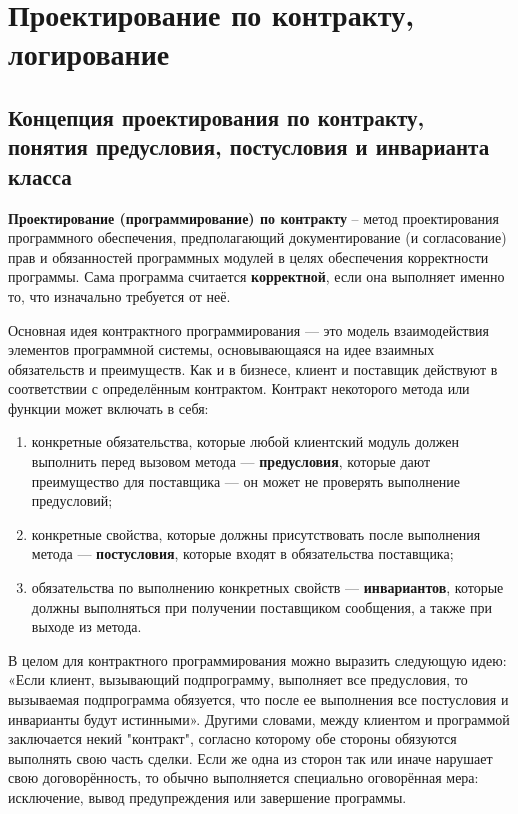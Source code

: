 \newpage
\chapter{Проектирование по контракту, логирование}

\section{Концепция проектирования по контракту, понятия предусловия, постусловия и инварианта класса}

\textbf{Проектирование (программирование) по контракту} –  метод проектирования программного обеспечения, предполагающий документирование (и согласование) прав и обязанностей программных модулей в целях обеспечения корректности программы. Сама программа считается \textbf{корректной}, если она выполняет именно то, что изначально требуется от неё.

Основная идея контрактного программирования — это модель взаимодействия элементов программной системы, основывающаяся на идее взаимных обязательств и преимуществ. Как и в бизнесе, клиент и поставщик действуют в соответствии с определённым контрактом. Контракт некоторого метода или функции может включать в себя:

\begin{enumerate}
    \item конкретные обязательства, которые любой клиентский модуль должен выполнить перед вызовом метода — \textbf{предусловия}, которые дают преимущество для поставщика — он может не проверять выполнение предусловий;
    \item конкретные свойства, которые должны присутствовать после выполнения метода — \textbf{постусловия}, которые входят в обязательства поставщика;
    \item обязательства по выполнению конкретных свойств — \textbf{инвариантов}, которые должны выполняться при получении поставщиком сообщения, а также при выходе из метода.
\end{enumerate}

В целом для контрактного программирования можно выразить следующую идею: «Если клиент, вызывающий подпрограмму, выполняет все предусловия, то вызываемая подпрограмма обязуется, что после ее выполнения все постусловия и инварианты будут истинными». Другими словами, между клиентом и программой заключается некий "контракт", согласно которому обе стороны обязуются выполнять свою часть сделки. Если же одна из сторон так или иначе нарушает свою договорённость, то обычно выполняется специально оговорённая мера: исключение, вывод предупреждения или завершение программы.

